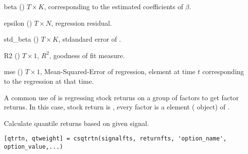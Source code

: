 \outarg
   \begin{argdesc}
   \item[beta]     (\myfints{}) $T\times K$, corresponding to the estimated coefficients of $\beta$.
   \item[epsilon]  (\myfints{}) $T\times N$, regression residual.
   \item[std\_beta](\myfints{}) $T\times K$, stdandard error of .
   \item[R2]       (\myfints{}) $T\times 1$, $R^2$, goodness of fit measure.
   \item[mse]      (\myfints{}) $T\times 1$, Mean-Squared-Error of regression,
                   element at time $t$ corresponding to the regression at that time. 
   \end{argdesc}

A common use of  is regressing stock returns on a group of factors
to get factor returns. In this case, stock return is ,
every factor is a element (\myfints{} object) of .

    Calculate quantile returns based on given signal.

\usage
   \begin{lstlisting}[numbers=none]
   [qtrtn, qtweight] = csqtrtn(signalfts, returnfts, 'option_name', option_value,...)
   \end{lstlisting}

